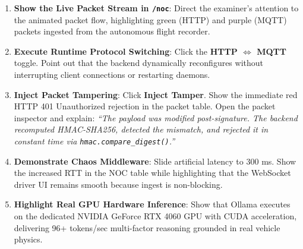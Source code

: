 \documentclass[12pt,a4paper]{report}
\begin{document}
\begin{enumerate}[leftmargin=1.5cm]
  \item \textbf{Show the Live Packet Stream in \texttt{/noc}}: Direct the examiner's attention to the animated packet flow, highlighting green (HTTP) and purple (MQTT) packets ingested from the autonomous flight recorder.
  \item \textbf{Execute Runtime Protocol Switching}: Click the \textbf{HTTP $\Longleftrightarrow$ MQTT} toggle. Point out that the backend dynamically reconfigures without interrupting client connections or restarting daemons.
  \item \textbf{Inject Packet Tampering}: Click \textbf{Inject Tamper}. Show the immediate red HTTP 401 Unauthorized rejection in the packet table. Open the packet inspector and explain: \textit{``The payload was modified post-signature. The backend recomputed HMAC-SHA256, detected the mismatch, and rejected it in constant time via \texttt{hmac.compare\_digest()}.''}
  \item \textbf{Demonstrate Chaos Middleware}: Slide artificial latency to 300 ms. Show the increased RTT in the NOC table while highlighting that the WebSocket driver UI remains smooth because ingest is non-blocking.
  \item \textbf{Highlight Real GPU Hardware Inference}: Show that Ollama executes on the dedicated NVIDIA GeForce RTX 4060 GPU with CUDA acceleration, delivering 96+ tokens/sec multi-factor reasoning grounded in real vehicle physics.
\end{enumerate}
\end{document}

